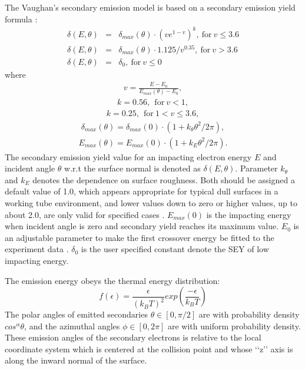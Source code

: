The Vaughan's secondary emission model is based on a secondary emission yield formula \cite{Vaughan, VaughanRv}:
\begin{subequations}
\label{allequations}
\begin{eqnarray}
    \delta(E,\theta)&=&\delta_{max}(\theta)\cdot (v e^{1-v})^k,\ \text{for}\ v \le 3.6 \label{eq:VaughanA} 
\\
\delta(E,\theta)&=&\delta_{max}(\theta)\cdot 1.125/v^{0.35},\ \text{for}\ v > 3.6 \label{eq:VaughanB} 
\\
\delta(E,\theta)&=&\delta_0,\ \text{for}\ v \le 0 \label{eq:VaughanC} 
\end{eqnarray}
\end{subequations}
where 
\begin{eqnarray*}
v=\frac{\displaystyle E-E_0}{\displaystyle E_{max}(\theta)-E_0},
\end{eqnarray*}
\begin{eqnarray*}
k=0.56,\ \ \text{for}\ v<1,
\end{eqnarray*}
\begin{eqnarray*}
k=0.25,\ \ \text{for}\ 1<v\le{3.6},
\end{eqnarray*}
\begin{eqnarray*}
\delta_{max}(\theta)=\delta_{max}(0)\cdot (1+k_{\theta}\theta^2/2\pi),
\end{eqnarray*}
\begin{eqnarray*}
E_{max}(\theta)=E_{max}(0)\cdot (1+k_E\theta^2/2\pi).
\end{eqnarray*}
The secondary emission yield value for an impacting electron energy $E$ and incident angle $\theta$ w.r.t the surface normal is denoted as $\delta(E,\theta)$. Parameter $k_{\theta}$ and $k_E$ denotes the dependence on surface roughness. Both
should be assigned a default value of 1.0, which appears appropriate for typical dull surfaces in a working tube environment, and lower values down to zero or higher values, up to about 2.0, are only valid for specified cases \cite{Vaughan}. $E_{max}(0)$ is the impacting energy when incident angle is zero and secondary yield reaches its maximum value. $E_0$ is an adjustable parameter to make the first crossover energy be fitted to the experiment data \cite{FS}. $\delta_0$ is the user specified constant denote the SEY of low impacting energy. 

The emission energy obeys the thermal energy distribution:
\begin{equation}
f(\epsilon) = \frac{\epsilon}{(k_BT)^2}exp\left(\frac{-\epsilon}{k_BT}\right) \label{eq:emienergy}
\end{equation}
The polar angles of emitted secondaries $\theta \in [0, \pi/2]$ are with probability density $cos^{\alpha}\theta$, and the azimuthal angles $\phi \in [0, 2\pi]$ are with uniform probability density. These emission angles of the secondary electrons is relative to the local coordinate system which is centered at the collision point and whose ‘‘z’’ axis is along the inward normal of the surface.

